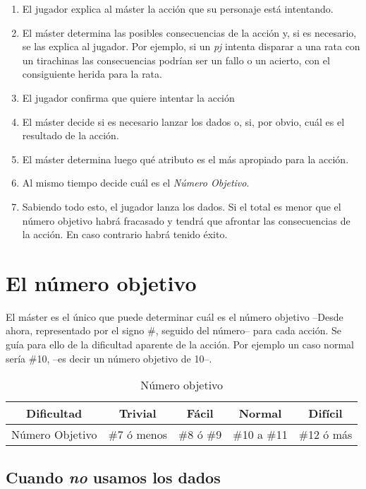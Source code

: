 \begin{enumerate}
\item El jugador explica al máster la acción que su personaje está intentando.
\item El máster determina las posibles consecuencias de la acción y, 
si es necesario, se las explica al jugador. Por ejemplo, si un \emph{pj} intenta disparar a una rata con un tirachinas las consecuencias podrían ser un fallo o un acierto, con el consiguiente herida para la rata.
\item El jugador confirma que quiere intentar la acción
\item El máster decide si es necesario lanzar los dados o, si, por obvio, cuál es el resultado de la acción.
\item El máster determina luego qué atributo es el más apropiado para la acción.
\item Al mismo tiempo decide cuál es el \emph{Número Objetivo}.
\item Sabiendo todo esto, el jugador lanza los dados. Si el total es menor que el número objetivo habrá fracasado y tendrá que afrontar las consecuencias de la acción. En caso contrario habrá tenido éxito.

\end{enumerate}

\section{El número objetivo}
El máster es el único que puede determinar cuál es el número objetivo --Desde ahora, representado por el signo \#, seguido del número--  para cada acción. Se guía para ello de la dificultad aparente de la acción. Por ejemplo un caso normal sería \#10, --es decir un número objetivo de 10--.

\begin{table}[h]
\centering
\begin{tabular}{ccccc}
\toprule
Dificultad&Trivial&Fácil&Normal&Difícil\\\midrule
Número Objetivo&\#7 ó menos&\#8 ó \#9&\#10 a \#11&\#12 ó más\\\midrule
\bottomrule
\end{tabular}
\caption{Número objetivo}
\end{table}

\subsection*{Cuando \emph{no} usamos los dados}

